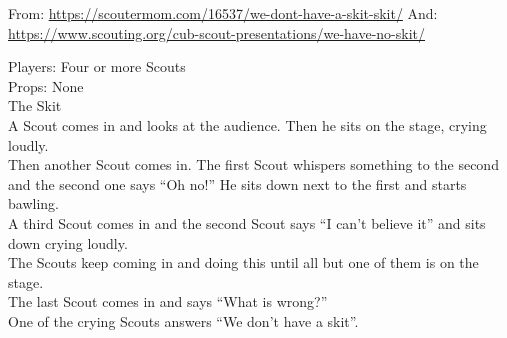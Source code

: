 
From: \url{https://scoutermom.com/16537/we-dont-have-a-skit-skit/}
And: \url{https://www.scouting.org/cub-scout-presentations/we-have-no-skit/}

Players: Four or more Scouts\\

Props: None\\

The Skit\\

A Scout comes in and looks at the audience. Then he sits on the stage, crying loudly.\\

Then another Scout comes in. The first Scout whispers something to the second and the second one says “Oh no!” He sits down next to the first and starts bawling.\\

A third Scout comes in and the second Scout says “I can’t believe it” and sits down crying loudly.\\

The Scouts keep coming in and doing this until all but one of them is on the stage.\\

The last Scout comes in and says “What is wrong?”\\

One of the crying Scouts answers “We don’t have a skit”.\\
